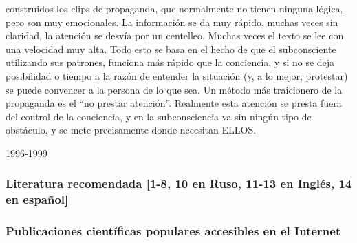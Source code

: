 construidos los clips de propaganda, que normalmente no tienen ninguna
lógica, pero son muy emocionales. La información se da muy rápido,
muchas veces sin claridad, la atención se desvía por un centelleo.
Muchas veces el texto se lee con una velocidad muy alta. Todo esto se
basa en el hecho de que el subconsciente utilizando sus patrones,
funciona más rápido que la conciencia, y si no se deja posibilidad o
tiempo a la razón de entender la situación (y, a lo mejor, protestar) se
puede convencer a la persona de lo que sea. Un método más traicionero de
la propaganda es el ``no prestar atención''. Realmente esta atención se
presta fuera del control de la conciencia, y en la subconsciencia va sin
ningún tipo de obstáculo, y se mete precisamente donde necesitan ELLOS.

1996-1999

\protect\hypertarget{M26}{}{}

\subsubsection{Literatura recomendada {[}1-8, 10 en Ruso, 11-13 en
Inglés, 14 en
español{]}}\label{literatura-recomendada-1-8-10-en-ruso-11-13-en-ingluxe9s-14-en-espauxf1ol}

\subsubsection{Publicaciones científicas populares accesibles en el
Internet}\label{publicaciones-cientuxedficas-populares-accesibles-en-el-internet}

